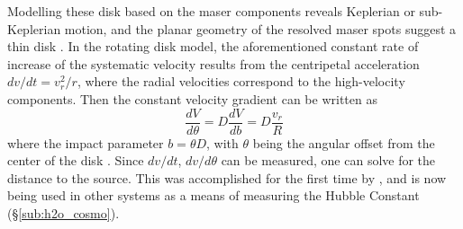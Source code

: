 Modelling these disk based on the maser components reveals Keplerian or sub-Keplerian motion, and the planar geometry of the resolved maser spots suggest a thin disk \citep{lo2005}. In the rotating disk model, the aforementioned constant rate of increase of the systematic velocity results from the centripetal acceleration $dv/dt = v_r^2/r$, where the radial velocities correspond to the high-velocity components. Then the constant velocity gradient can be written as
\begin{equation}
\label{eq:disk_rot}
\frac{dV}{d\theta} = D \frac{dV}{db} = D \frac{v_r}{R}
\end{equation}
where the impact parameter $b= \theta D$, with $\theta$ being the angular offset from the center of the disk \citep{lo2005}. Since $dv/dt$, $dv/d\theta$ can be measured, one can solve for the distance to the source. This was accomplished for the first time by \citet{Miyoshi_1994}, and is now being used in other systems as a means of measuring the Hubble Constant (\S\ref{sub:h2o_cosmo}).

